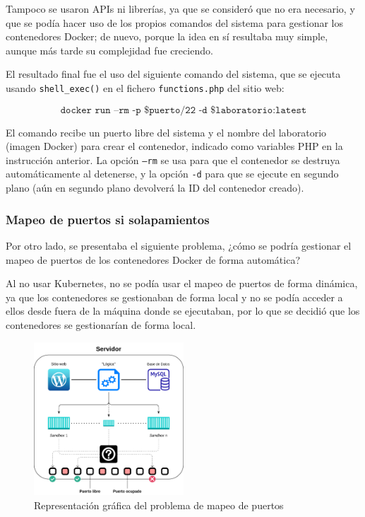             Tampoco se usaron APIs ni librerías, ya que se consideró que no era necesario, y que se podía hacer uso de los propios comandos del sistema para gestionar los contenedores Docker; de nuevo, porque la idea en sí resultaba muy simple, aunque más tarde su complejidad fue creciendo.

            El resultado final fue el uso del siguiente comando del sistema, que se ejecuta usando \texttt{shell\_exec()} en el fichero \texttt{functions.php} del sitio web:
            
            $$
            \texttt{docker run --rm -p \${puerto}/22 -d \${laboratorio}:latest}
            $$
            
            El comando recibe un puerto libre del sistema y el nombre del laboratorio (imagen Docker) para crear el contenedor, indicado como variables PHP en la instrucción anterior. La opción \texttt{--rm} se usa para que el contenedor se destruya automáticamente al detenerse, y la opción \texttt{-d} para que se ejecute en segundo plano (aún en segundo plano devolverá la ID del contenedor creado).


        \subsubsection{Mapeo de puertos si solapamientos}

            Por otro lado, se presentaba el siguiente problema, ¿cómo se podría gestionar el mapeo de puertos de los contenedores Docker de forma automática?

            Al no usar Kubernetes, no se podía usar el mapeo de puertos de forma dinámica, ya que los contenedores se gestionaban de forma local y no se podía acceder a ellos desde fuera de la máquina donde se ejecutaban, por lo que se decidió que los contenedores se gestionarían de forma local.

            \begin{figure}[htbp]
                \centering

                \includegraphics[width=0.5\textwidth]{images/Diagramas/puertos.png}
                \caption{Representación gráfica del problema de mapeo de puertos}
                \label{fig:mapeo-puertos}
            \end{figure}

